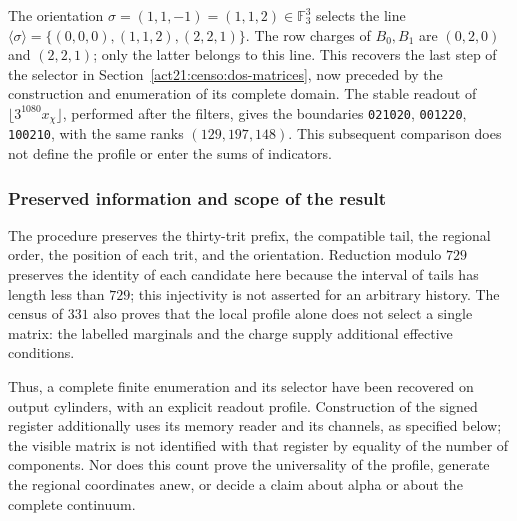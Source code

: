 The orientation \(\sigma=(1,1,-1)=(1,1,2)\in\mathbb F_3^3\)
selects the line
\(\langle\sigma\rangle=\{(0,0,0),(1,1,2),(2,2,1)\}\).
The row charges of \(B_0,B_1\) are \((0,2,0)\) and \((2,2,1)\);
only the latter belongs to this line. This recovers the last step
of the selector in Section~\ref{act21:censo:dos-matrices}, now preceded by
the construction and enumeration of its complete domain. The stable readout
of \(\lfloor3^{1080}x_\chi\rfloor\), performed after the filters,
gives the boundaries \texttt{021020}, \texttt{001220}, \texttt{100210},
with the same ranks \((129,197,148)\). This subsequent comparison does not define
the profile or enter the sums of indicators.

\subsubsection{Preserved information and scope of the result}

The procedure preserves the thirty-trit prefix, the compatible tail,
the regional order, the position of each trit, and the orientation. Reduction
modulo \(729\) preserves the identity of each candidate here because the
interval of tails has length less than \(729\); this injectivity
is not asserted for an arbitrary history. The census of \(331\) also proves
that the local profile alone does not select a single matrix: the
labelled marginals and the charge supply additional effective conditions.

Thus, a complete finite enumeration and its selector have been recovered
on output cylinders, with an explicit readout profile. Construction
of the signed register additionally uses its memory reader and its channels,
as specified below; the visible matrix is not identified with
that register by equality of the number of components. Nor does this count
prove the universality of the profile, generate the regional coordinates
anew, or decide a claim about alpha or about the complete continuum.
